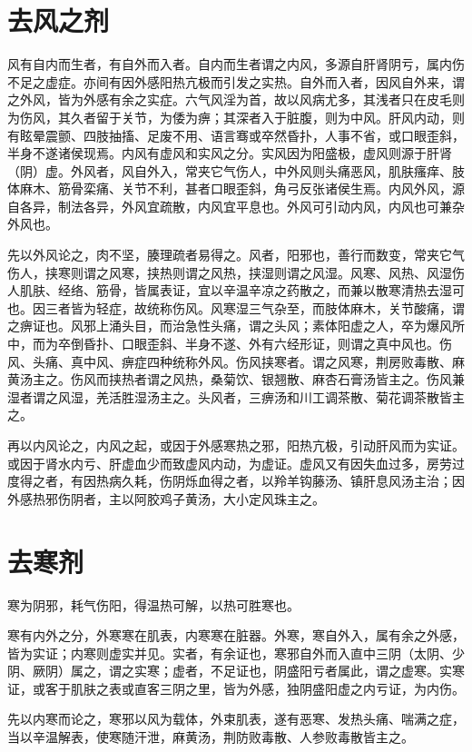 \documentclass[UTF8]{ctexart}
\begin{document}
\section{去风之剂}
风有自内而生者，有自外而入者。自内而生者谓之内风，多源自肝肾阴亏，属内伤不足之虚症。亦间有因外感阳热亢极而引发之实热。自外而入者，因风自外来，谓之外风，皆为外感有余之实症。六气风淫为首，故以风病尤多，其浅者只在皮毛则为伤风，其久者留于关节，为倭为痹；其深者入于脏腹，则为中风。肝风内动，则有眩晕震颤、四肢抽搐、足废不用、语言骞或卒然昏扑，人事不省，或口眼歪斜，半身不遂诸侯现焉。内风有虚风和实风之分。实风因为阳盛极，虚风则源于肝肾（阴）虚。外风者，风自外入，常夹它气伤人，中外风则头痛恶风，肌肤瘙痒、肢体麻木、筋骨栾痛、关节不利，甚者口眼歪斜，角弓反张诸侯生焉。内风外风，源自各异，制法各异，外风宜疏散，内风宜平息也。外风可引动内风，内风也可兼杂外风也。

先以外风论之，肉不坚，腠理疏者易得之。风者，阳邪也，善行而数变，常夹它气伤人，挟寒则谓之风寒，挟热则谓之风热，挟湿则谓之风湿。风寒、风热、风湿伤人肌肤、经络、筋骨，皆属表证，宜以辛温辛凉之药散之，而兼以散寒清热去湿可也。因三者皆为轻症，故统称伤风。风寒湿三气杂至，而肢体麻木，关节酸痛，谓之痹证也。风邪上涌头目，而治急性头痛，谓之头风；素体阳虚之人，卒为爆风所中，而为卒倒昏扑、口眼歪斜、半身不遂、外有六经形证，则谓之真中风也。伤风、头痛、真中风、痹症四种统称外风。伤风挟寒者。谓之风寒，荆房败毒散、麻黄汤主之。伤风而挟热者谓之风热，桑菊饮、银翘散、麻杏石膏汤皆主之。伤风兼湿者谓之风湿，羌活胜湿汤主之。头风者，三痹汤和川工调茶散、菊花调茶散皆主之。

再以内风论之，内风之起，或因于外感寒热之邪，阳热亢极，引动肝风而为实证。或因于肾水内亏、肝虚血少而致虚风内动，为虚证。虚风又有因失血过多，房劳过度得之者，有因热病久耗，伤阴烁血得之者，以羚羊钩藤汤、镇肝息风汤主治；因外感热邪伤阴者，主以阿胶鸡子黄汤，大小定风珠主之。

\section{去寒剂}
寒为阴邪，耗气伤阳，得温热可解，以热可胜寒也。

寒有内外之分，外寒寒在肌表，内寒寒在脏器。外寒，寒自外入，属有余之外感，皆为实证；内寒则虚实并见。实者，有余证也，寒邪自外而入直中三阴（太阴、少阴、厥阴）属之，谓之实寒；虚者，不足证也，阴盛阳亏者属此，谓之虚寒。实寒证，或客于肌肤之表或直客三阴之里，皆为外感，独阴盛阳虚之内亏证，为内伤。

先以内寒而论之，寒邪以风为载体，外束肌表，遂有恶寒、发热头痛、喘满之症，当以辛温解表，使寒随汗泄，麻黄汤，荆防败毒散、人参败毒散皆主之。
\end{document}

